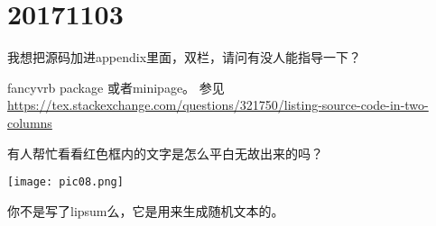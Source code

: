 \documentclass[QA.tex]{subfiles}
\begin{document}
%
%

\chapter{20171103}\label{ch1103}

\begin{qst}\label{Q2017110301}
我想把源码加进appendix里面，双栏，请问有没人能指导一下？
\end{qst}
\ans fancyvrb package 或者minipage。
参见\url{https://tex.stackexchange.com/questions/321750/listing-source-code-in-two-columns}

\begin{qst}\label{Q2017110302}
有人帮忙看看红色框内的文字是怎么平白无故出来的吗？

\texttt{[image: pic08.png]}
\end{qst}
\ans 你不是写了lipsum么，它是用来生成随机文本的。
\end{document}
